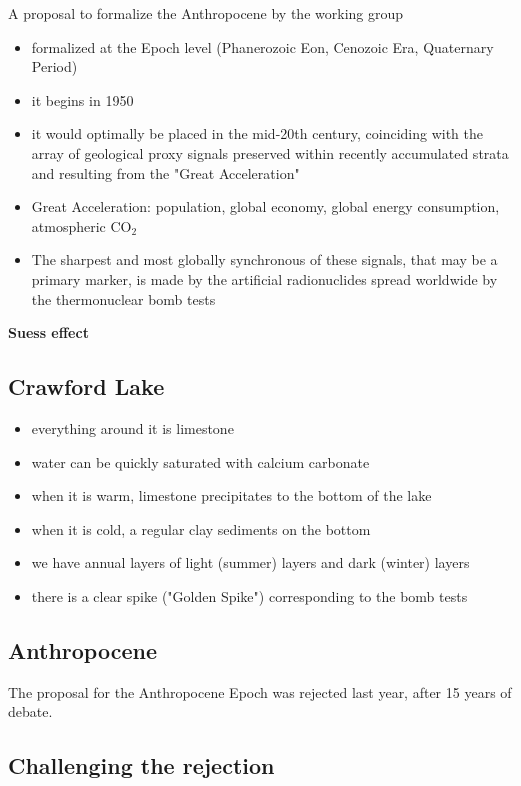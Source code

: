 A proposal to formalize the Anthropocene by the working group
\begin{itemize}
	\item formalized at the Epoch level (Phanerozoic Eon, Cenozoic Era,
	 Quaternary Period)
	\item it begins in 1950
	\item it would optimally be placed in the mid-20th century, coinciding
	 with the array of geological proxy signals preserved within recently
	 accumulated strata and resulting from the "Great Acceleration"
	\item Great Acceleration: population, global economy, global energy
	 consumption, atmospheric CO$_2$
	\item The sharpest and most globally synchronous of these signals,
	 that may be a primary marker, is made by the artificial radionuclides
	 spread worldwide by the thermonuclear bomb tests
\end{itemize}

\textbf{Suess effect}

\subsection{Crawford Lake}
\begin{itemize}
	\item everything around it is limestone
	\item water can be quickly saturated with calcium carbonate
	\item when it is warm, limestone precipitates to the bottom of the lake
	\item when it is cold, a regular clay sediments on the bottom
	\item we have annual layers of light (summer) layers and dark (winter)
	 layers
	\item there is a clear spike ("Golden Spike") corresponding to the
	 bomb tests
\end{itemize}

\subsection{Anthropocene}

The proposal for the Anthropocene Epoch was rejected last year, after 15 years
of debate.

\subsection{Challenging the rejection}

